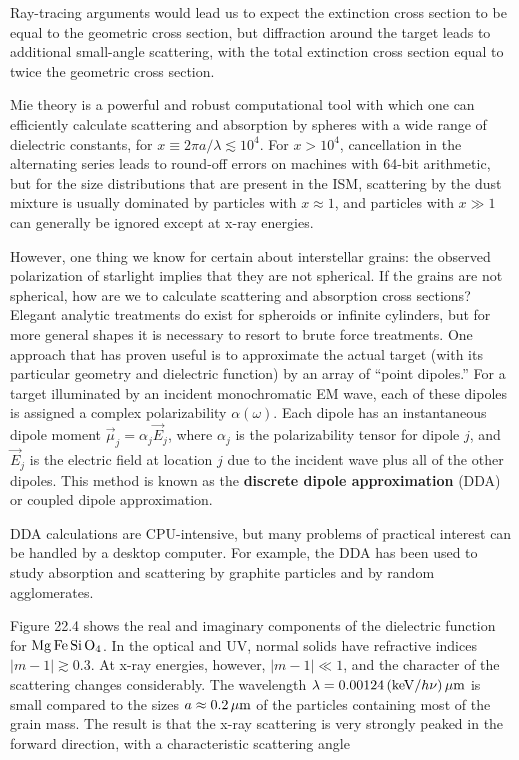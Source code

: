 \documentclass[a4paper,10pt]{article}
\begin{document}
{\noindent}Ray-tracing arguments would lead us to expect the extinction cross section to be equal to the geometric cross section, but diffraction around the target leads to additional small-angle scattering, with the total extinction cross section equal to twice the geometric cross section.

{\noindent}Mie theory is a powerful and robust computational tool with which one can efficiently calculate scattering and absorption by spheres with a wide range of dielectric constants, for $x\equiv2\pi a/\lambda\lesssim10^4$. For $x>10^4$, cancellation in the alternating series leads to round-off errors on machines with 64-bit arithmetic, but for the size distributions that are present in the ISM, scattering by the dust mixture is usually dominated by particles with $x\approx1$, and particles with $x\gg1$ can generally be ignored except at x-ray energies.

{\noindent}However, one thing we know for certain about interstellar grains: the observed polarization of starlight implies that they are not spherical. If the grains are not spherical, how are we to calculate scattering and absorption cross sections? Elegant analytic treatments do exist for spheroids or infinite cylinders, but for more general shapes it is necessary to resort to brute force treatments. One approach that has proven useful is to approximate the actual target (with its particular geometry and dielectric function) by an array of ``point dipoles.'' For a target illuminated by an incident monochromatic EM wave, each of these dipoles is assigned a complex polarizability $\alpha(\omega)$. Each dipole has an instantaneous dipole moment $\vec{\mu}_j=\alpha_j\vec{E}_j$, where $\alpha_j$ is the polarizability tensor for dipole $j$, and $\vec{E}_j$ is the electric field at location $j$ due to the incident wave plus all of the other dipoles. This method is known as the \textbf{discrete dipole approximation} (DDA) or coupled dipole approximation.

{\noindent}DDA calculations are CPU-intensive, but many problems of practical interest can be handled by a desktop computer. For example, the DDA has been used to study absorption and scattering by graphite particles and by random agglomerates.

{\noindent}Figure 22.4 shows the real and imaginary components of the dielectric function for ${\rm Mg\,Fe\,Si\,O_4}$. In the optical and UV, normal solids have refractive indices $|m-1|\gtrsim0.3$. At x-ray energies, however, $|m-1|\ll1$, and the character of the scattering changes considerably. The wavelength $\lambda=0.00124\,({\rm keV}/h\nu)\,\mu{\rm m}$ is small compared to the sizes $a\approx0.2\,\mu{\rm m}$ of the particles containing most of the grain mass. The result is that the x-ray scattering is very strongly peaked in the forward direction, with a characteristic scattering angle
\end{document}
